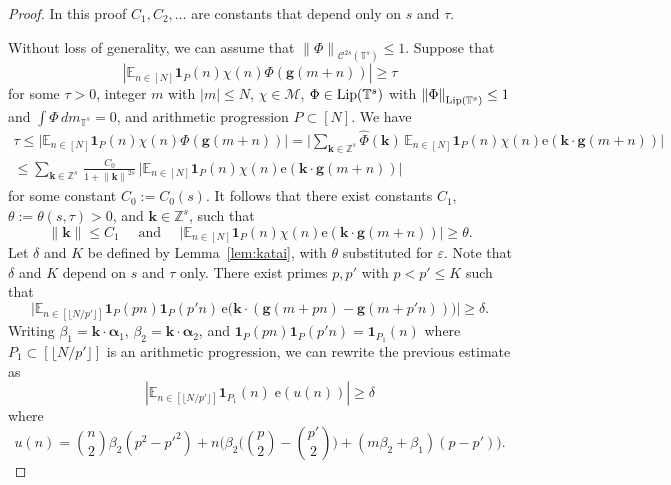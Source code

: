 \documentclass[11pt]{amsart}
\theoremstyle{definition}
\begin{document}
\begin{proof}
In this proof  $C_1,C_2,\ldots$ are constants that  depend only on
$s$ and $\tau$.

Without loss of generality, we can assume  that
${\lVert \Phi \rVert}_{{{\mathcal C}}^{2s}({{\mathbb T}}^s)}\leq 1$. Suppose that
$$
|{{\mathbb E}}_{n\in[N]}{\mathbf{1}}_P(n) \chi(n)\Phi({{\mathbf{g}}}(m+n))|\geq\tau
$$  for some
$\tau>0$, integer $m$ with $|m|\leq N$, $\chi \in{{\mathcal M}}$, $\Phi\in
{{\text{\rm Lip}}}({{\mathbb T}}^s)$ with   ${\lVert \Phi \rVert}_{{{\text{\rm Lip}}}({{\mathbb T}}^s)}\leq
1$ and $\int \Phi \, dm_{{{\mathbb T}}^s}=0$, and arithmetic progression $P\subset[N]$. We have
\begin{multline*}
\tau\leq\bigl|{{\mathbb E}}_{n\in[N]}{\mathbf{1}}_P(n)\chi(n)\Phi({{\mathbf{g}}}(m+n))\bigr|
=\bigl|
\sum_{{{\mathbf{k}}}\in{{\mathbb Z}}^s}\widehat\Phi({{\mathbf{k}}})\,{{\mathbb E}}_{n\in[N]}{\mathbf{1}}_P(n)\chi(n){\mathrm{e}}({{\mathbf{k}}}\cdot{{\mathbf{g}}}(m+n))
\bigr|\\
\leq \sum_{{{\mathbf{k}}}\in{{\mathbb Z}}^s}\,\frac
{C_0}{1+{\lVert {{\mathbf{k}}} \rVert}^{2s}}\,\bigl|{{\mathbb E}}_{n\in[N]}{\mathbf{1}}_P(n)\chi(n){\mathrm{e}}({{\mathbf{k}}}\cdot{{\mathbf{g}}}(m+n))\bigr|
\end{multline*}
for some constant $C_0:=C_0(s)$. It follows that there exist
constants  $C_1$, $\theta:=\theta(s,\tau)>0$, and  ${{\mathbf{k}}}\in{{\mathbb Z}}^s$,
such that
$$
{\lVert {{\mathbf{k}}} \rVert}\leq C_1\quad \text{ and }\quad
|{{\mathbb E}}_{n\in[N]}{\mathbf{1}}_P(n)\chi(n){\mathrm{e}}({{\mathbf{k}}}\cdot {{\mathbf{g}}}(m+n))\bigr|\geq\theta.
$$
Let $\delta$ and $K$ be defined by Lemma~\ref{lem:katai}, with
 $\theta$ substituted for ${\varepsilon}$. Note that
$\delta$ and $K$ depend on $s$ and $\tau$ only.  There exist primes
$p,p'$ with $p<p'\leq K$ such that
$$
\bigl|{{\mathbb E}}_{n\in[\lfloor
N/p'\rfloor]}{\mathbf{1}}_P(pn){\mathbf{1}}_P(p'n)\,{\mathrm{e}}\bigl({{\mathbf{k}}}\cdot
({{\mathbf{g}}}(m+pn)-{{\mathbf{g}}}(m+p'n))\bigr)\bigr|\geq \delta.
$$
Writing $\beta_1={{\mathbf{k}}}\cdot{{\boldsymbol{\alpha}}}_1$, $\beta_2={{\mathbf{k}}}\cdot {{\boldsymbol{\alpha}}}_2$,
and ${\mathbf{1}}_P(pn){\mathbf{1}}_P(p'n)={\mathbf{1}}_{P_1}(n)$ where $P_1\subset [\lfloor
N/p'\rfloor]$ is an arithmetic progression,  we can rewrite the previous
estimate  as
$$|{{\mathbb E}}_{n\in[\lfloor N/p'\rfloor] } {\mathbf{1}}_{P_1}(n) \; {\mathrm{e}}(u(n))|\geq\delta$$
 where
$$
u(n)= \binom n2  \beta_2(p^2-p'^2)+ n\Big( \beta_2\bigl(\binom
p2-\binom{p'}2\bigr)+(m\beta_2+\beta_1)(p-p')\Big).
$$
\end{proof}
\end{document}
